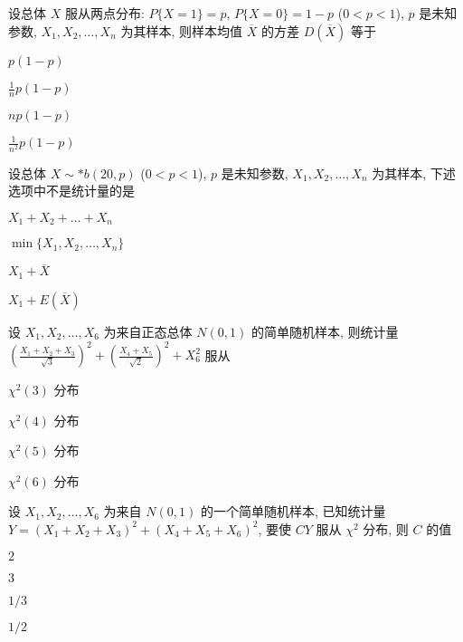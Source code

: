 \documentclass{exam-zh}
\begin{document}
\begin{question}
  设总体 $X$ 服从两点分布: $P\{X = 1\} = p$, $P\{X = 0\} = 1 - p$ ($0 < p < 1$), $p$ 是未知参数, $X_1, X_2, \dots, X_n$ 为其样本, 则样本均值 $\overline{X}$ 的方差 $D(\overline{X})$ 等于
  \paren[B]

  \begin{choices}
    \item $p(1-p)$
    \item $\frac{1}{n}p(1-p)$
    \item $np(1-p)$
    \item $\frac{1}{n^2}p(1-p)$
  \end{choices}
\end{question}

\begin{question}
  设总体 $X \sim* b(20, p)$ ($0 < p < 1$), $p$ 是未知参数, $X_1, X_2, \dots, X_n$ 为其样本, 下述选项中不是统计量的是
  \paren[D]

  \begin{choices}
    \item $X_1 + X_2 + \dots + X_n$
    \item $\min\{X_1, X_2, \dots, X_n\}$
    \item $X_1 + \overline{X}$
    \item $X_1 + E(\overline{X})$
  \end{choices}
\end{question}

\begin{question}
  设 $X_1, X_2, \dots, X_6$ 为来自正态总体 $N(0, 1)$ 的简单随机样本, 则统计量 $(\frac{X_1 + X_2 + X_3}{\sqrt{3}})^2 + (\frac{X_4 + X_5}{\sqrt{2}})^2 + X_6^2$ 服从
  \paren[A]

  \begin{choices}
    \item $\chi^2(3)$ 分布
    \item $\chi^2(4)$ 分布
    \item $\chi^2(5)$ 分布
    \item $\chi^2(6)$ 分布
  \end{choices}
\end{question}

\begin{question}
  设 $X_1, X_2, \dots, X_6$ 为来自 $N(0, 1)$ 的一个简单随机样本, 已知统计量 $Y = (X_1 + X_2 + X_3)^2 + (X_4 + X_5 + X_6)^2$, 要使 $CY$ 服从 $\chi^2$ 分布, 则 $C$ 的值
  \paren[C]

  \begin{choices}
    \item $2$
    \item $3$
    \item $1/3$
    \item $1/2$
  \end{choices}
\end{question}
\end{document}
